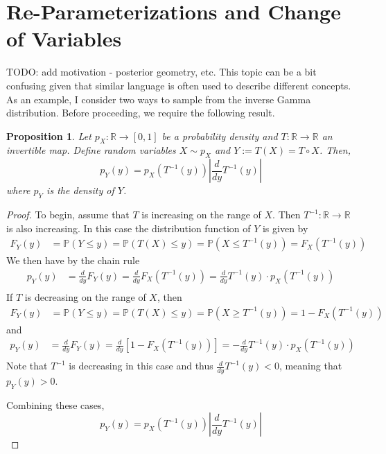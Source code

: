 \documentclass[12pt]{article}
\newcommand*{\abs}[1]{\left\lvert#1\right\rvert}
\newcommand{\R}{\mathcal{R}}
\newcommand{\Prob}{\mathbb{P}}
\def\R{\mathbb{R}}
\newtheorem{prop}{Proposition}
\begin{document}
\section{Re-Parameterizations and Change of Variables}

TODO: add motivation - posterior geometry, etc. This topic can be a bit confusing given that similar language is often used to describe different concepts. As an example, I consider two 
ways to sample from the inverse Gamma distribution. Before proceeding, we require the following result. 

\begin{prop}
Let $p_X: \R \to [0, 1]$ be a probability density and $T: \R \to \R$ an invertible map. Define random variables $X \sim p_X$ and 
$Y := T(X) = T \circ X$. Then, 
\[p_Y(y) = p_X(T^{-1}(y)) \abs{\frac{d}{dy} T^{-1}(y)}\] 
where $p_Y$ is the density of $Y$. 
\end{prop}

\begin{proof}
To begin, assume that $T$ is increasing on the range of $X$. Then $T^{-1}: \R \to \R$ is also increasing. In this case the distribution function of $Y$ is given by 
\begin{align*}
F_Y(y) &= \Prob(Y \leq y) = \Prob(T(X) \leq y) = \Prob(X \leq T^{-1}(y)) = F_X(T^{-1}(y))
\end{align*}
We then have by the chain rule
\begin{align*}
p_Y(y) &=  \frac{d}{dy} F_Y(y) = \frac{d}{dy} F_X(T^{-1}(y)) = \frac{d}{dy} T^{-1}(y) \cdot p_X(T^{-1}(y)) \\
\end{align*}
If $T$ is decreasing on the range of $X$, then 
\begin{align*}
F_Y(y) &= \Prob(Y \leq y) = \Prob(T(X) \leq y) = \Prob(X \geq T^{-1}(y)) = 1 - F_X(T^{-1}(y))
\end{align*}
and
\begin{align*}
p_Y(y) &=  \frac{d}{dy} F_Y(y) = \frac{d}{dy} [1 - F_X(T^{-1}(y))] = -\frac{d}{dy} T^{-1}(y) \cdot p_X(T^{-1}(y)) \\
\end{align*}
Note that $T^{-1}$ is decreasing in this case and thus $\frac{d}{dy} T^{-1}(y) < 0$, meaning that $p_Y(y) > 0$. 

Combining these cases, 
\[p_Y(y) = p_X(T^{-1}(y)) \abs{\frac{d}{dy} T^{-1}(y)}  \]

\end{proof}
\end{document}
